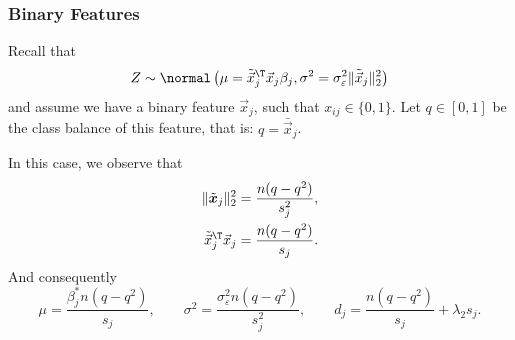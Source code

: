 \documentclass[aspectratio=1610,onlytextwidth]{beamer}
\begin{document}
%
%
%
%
%

\begin{frame}[c]
  \frametitle{Binary Features}
  Recall that
  \[
    Z \sim \normal\left(\mu = \tilde{\vec{x}}_j^\T\vec{x}_j \beta_j, \sigma^2 =  \sigma_\varepsilon^2 \lVert \tilde{\vec{x}}_j\rVert_2^2 \right)
  \]
  and assume we have a binary feature \(\vec{x}_j\), such that \(x_{ij} \in \{0, 1\}\). Let
  \(q \in [0, 1]\) be the class balance of this feature, that is: \(q = \bar{\vec{x}}_j\).

  \bigskip

  In this case, we observe that
  \[
    \begin{aligned}
      \lVert \tilde{\bm{x}}_j\rVert_2^2 & = \frac{n(q-q^2)}{s^2_j}, \\
      \tilde{\vec{x}}_j^\T \vec{x}_j    & = \frac{n(q - q^2)}{s_j}.
    \end{aligned}
  \]
  \pause%
  And consequently
  \[
    \mu = \frac{\beta^*_j n(q - q^2)}{s_j}, \qquad \sigma^2 = \frac{\sigma_\varepsilon^2n(q - q^2)}{s^2_j}, \qquad d_j = \frac{n(q -q^2)}{s_j}  + \lambda_2 s_j.
  \]
\end{frame}
\end{document}
